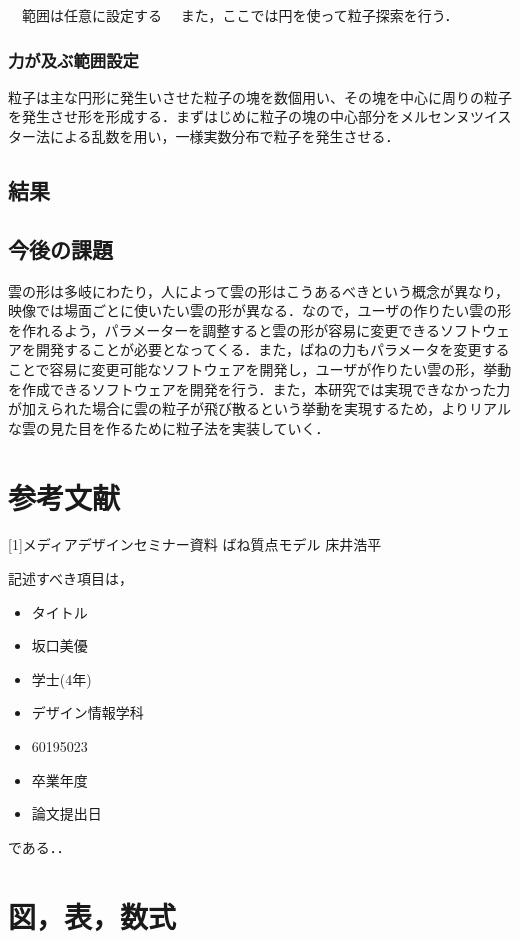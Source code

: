 \documentclass[11pt]{jreport}
\begin{document}
　範囲は任意に設定する
　また，ここでは円を使って粒子探索を行う．

\subsection{力が及ぶ範囲設定}





粒子は主な円形に発生いさせた粒子の塊を数個用い、その塊を中心に周りの粒子を発生させ形を形成する．まずはじめに粒子の塊の中心部分をメルセンヌツイスター法による乱数を用い，一様実数分布で粒子を発生させる．

\section{結果}


\section{今後の課題}
雲の形は多岐にわたり，人によって雲の形はこうあるべきという概念が異なり，映像では場面ごとに使いたい雲の形が異なる．なので，ユーザの作りたい雲の形を作れるよう，パラメーターを調整すると雲の形が容易に変更できるソフトウェアを開発することが必要となってくる．また，ばねの力もパラメータを変更することで容易に変更可能なソフトウェアを開発し，ユーザが作りたい雲の形，挙動を作成できるソフトウェアを開発を行う．また，本研究では実現できなかった力が加えられた場合に雲の粒子が飛び散るという挙動を実現するため，よりリアルな雲の見た目を作るために粒子法を実装していく．


\chapter{参考文献}
[1]メディアデザインセミナー資料 ばね質点モデル 床井浩平

記述すべき項目は，
\begin{itemize}
  \item タイトル
  \item 坂口美優
  \item 学士(4年)
  \item デザイン情報学科
  \item 60195023
  \item 卒業年度
  \item 論文提出日
\end{itemize}
である．．


\chapter{図，表，数式}\label{chap:fig-tab-exp}
\end{document}
